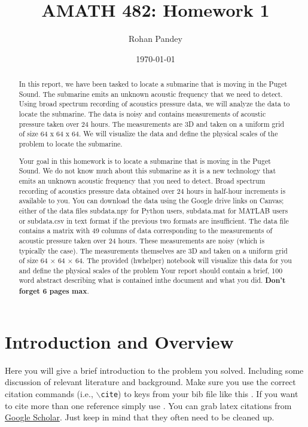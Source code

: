 \documentclass[11pt]{amsart}
\title{AMATH 482: Homework 1}
\author{Rohan Pandey} %
\date{\today} %
\begin{document}
\begin{abstract}
    In this report, we have been tasked to locate a submarine that is moving in the Puget Sound. The submarine emits an unknown acoustic frequency that we need to detect. Using broad spectrum recording of acoustics pressure data, we will analyze the data to locate the submarine. The data is noisy and contains measurements of acoustic pressure taken over 24 hours. The measurements are 3D and taken on a uniform grid of size 64 x 64 x 64. We will visualize the data and define the physical scales of the problem to locate the submarine.

    Your goal in this homework is to locate a submarine that is moving in the Puget Sound. We do not know
much about this submarine as it is a new technology that emits an unknown acoustic frequency that you
need to detect.
Broad spectrum recording of acoustics pressure data obtained over 24 hours in half-hour increments is
available to you. You can download the data using the Google drive links on Canvas; either of the data
files subdata.npy for Python users, subdata.mat for MATLAB users or subdata.csv in text format if the
previous two formats are insufficient.
The data file contains a matrix with 49 columns of data corresponding to the measurements of acoustic
pressure taken over 24 hours. These measurements are noisy (which is typically the case). The measurements
themselves are 3D and taken on a uniform grid of size 64 × 64 × 64. The provided (hwhelper) notebook will
visualize this data for you and define the physical scales of the problem
    Your report should contain a brief, 100 word abstract describing what is
    contained inthe document and what you did. {\bf Don't forget 6 pages max}.
\end{abstract}

\maketitle

\section{Introduction and Overview}\label{sec:Introduction}
Here you will give a brief introduction to the problem you solved. Including
some discussion of relevant literature and background.
Make sure you use the correct citation commands (i.e., \texttt{$\backslash$cite})
to keys
from your bib file like this \cite{example-article-citation}. If you want
to cite more than one reference simply use \cite{example-article-citation, example-
book-citation}. You can grab latex citations
from \href{https://scholar.google.com}{Google Scholar}. Just keep in mind that they
often
need to be cleaned up.
\end{document}
